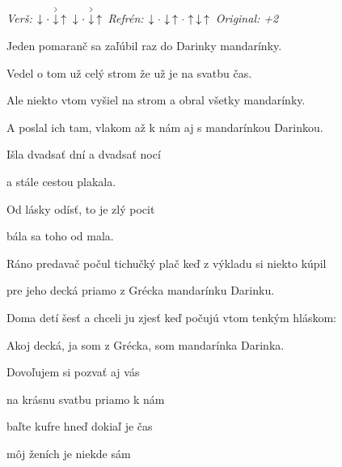 \begin{song}


 \quad
\textit{Verš:} $\Down\Miss\AccentDown\Up\ \Down\Miss\AccentDown\Up$ \quad
\textit{Refrén:} $\Down\Miss\Down\Up\Miss\Up\Down\Up$ \quad
\textit{Original: +2}

\large


\Large

\bigskip

Jeden pomaranč sa zaľúbil raz do Darinky mandarínky.\par
{}Vedel o tom už celý strom že už je na svatbu čas.\par
{}Ale niekto vtom vyšiel na strom a obral všetky mandarínky.\par
A poslal ich tam, vlakom až k nám aj s mandarínkou Darinkou.\par

\bigskip

Išla dvadsať dní a dvadsať nocí\par
a stále cestou plakala.\par
{}Od lásky odísť, to je zlý pocit\par
{}bála sa toho od mala. \par

\bigskip

Ráno predavač počul tichučký plač keď z výkladu si niekto kúpil\par
pre jeho decká priamo z Grécka mandarínku Darinku.\par
{}Doma detí šesť a chceli ju zjesť keď počujú vtom tenkým hláskom:\par
{}Akoj decká, ja som z Grécka, som mandarínka Darinka.\par

\bigskip

Dovoľujem si pozvať aj vás\par
na krásnu svatbu priamo k nám\par
{}baľte kufre hneď dokiaľ je čas\par
{}môj ženích je niekde sám \par


\end{song}
